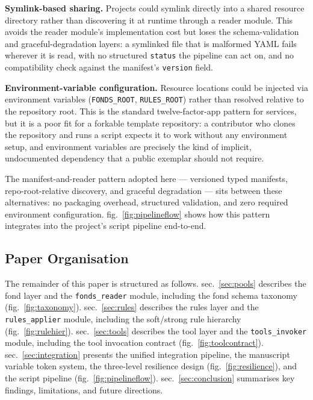 \documentclass[
]{article}
\begin{document}
\textbf{Symlink-based sharing.} Projects could symlink directly into a
shared resource directory rather than discovering it at runtime through
a reader module. This avoids the reader module's implementation cost but
loses the schema-validation and graceful-degradation layers: a symlinked
file that is malformed YAML fails wherever it is read, with no
structured \texttt{status} the pipeline can act on, and no compatibility
check against the manifest's \texttt{version} field.

\textbf{Environment-variable configuration.} Resource locations could be
injected via environment variables (\texttt{FONDS\_ROOT},
\texttt{RULES\_ROOT}) rather than resolved relative to the repository
root. This is the standard twelve-factor-app pattern for services, but
it is a poor fit for a forkable template repository: a contributor who
clones the repository and runs a script expects it to work without any
environment setup, and environment variables are precisely the kind of
implicit, undocumented dependency that a public exemplar should not
require.

The manifest-and-reader pattern adopted here --- versioned typed
manifests, repo-root-relative discovery, and graceful degradation ---
sits between these alternatives: no packaging overhead, structured
validation, and zero required environment configuration.
fig.~\ref{fig:pipelineflow} shows how this pattern integrates into the
project's script pipeline end-to-end.

\subsection{Paper Organisation}\label{paper-organisation}

The remainder of this paper is structured as follows.
sec.~\ref{sec:pools} describes the fond layer and the
\texttt{fonds\_reader} module, including the fond schema taxonomy
(fig.~\ref{fig:taxonomy}). sec.~\ref{sec:rules} describes the rules
layer and the \texttt{rules\_applier} module, including the soft/strong
rule hierarchy (fig.~\ref{fig:rulehier}). sec.~\ref{sec:tools} describes
the tool layer and the \texttt{tools\_invoker} module, including the
tool invocation contract (fig.~\ref{fig:toolcontract}).
sec.~\ref{sec:integration} presents the unified integration pipeline,
the manuscript variable token system, the three-level resilience design
(fig.~\ref{fig:resilience}), and the script pipeline
(fig.~\ref{fig:pipelineflow}). sec.~\ref{sec:conclusion} summarises key
findings, limitations, and future directions.
\end{document}
